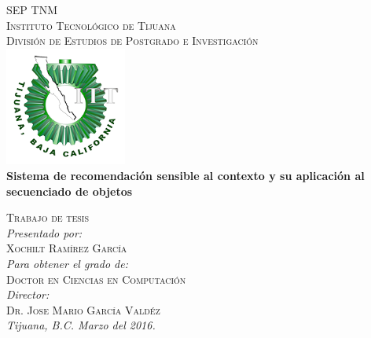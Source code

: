 \documentclass{article}
\begin{document}
 

\begin{center} 
{\textsc{\Large SEP } \hfill  \textsc{\Large TNM}}\\[0.3cm]
	\textsc{\Large Instituto Tecnol\'ogico de Tijuana}\\[0.5cm]
	\textsc{\Large Divisi\'on de Estudios de Postgrado e Investigaci\'on }\\[1.0cm]
	\includegraphics[width=0.3\textwidth]{img/logotec1}\\[0.5cm] %
	{ \LARGE \bfseries Sistema de recomendaci\'on sensible al contexto y su aplicaci\'on al secuenciado de objetos}\\ [2.0cm]
\end{center}

 \begin{minipage}{1.0\textwidth}
 	\begin{flushright} 
 	\textsc{Trabajo de tesis}\\[0.4cm]
 	\emph{Presentado por:} \\
 	\textsc{ Xochilt Ram\'irez Garc\'ia}\\
	\emph{Para obtener el grado de:} \\
 	\textsc{Doctor en Ciencias en Computaci\'on} \\
	\emph{Director:} \\
 	\textsc{Dr. Jose Mario Garc­\'ia Vald\'ez} \\
	\emph{Tijuana, B.C. Marzo del 2016.}
 	\end{flushright}
\end{minipage}


\pagestyle{empty} %
\end{document}
